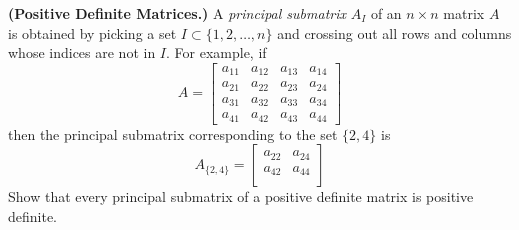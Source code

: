 \textbf{(Positive Definite Matrices.)}  A \textit{principal submatrix}
$A_I$ of  an $n \times n$ matrix $A$ is obtained by picking a set $I
\subset \{1,2,\dots,n\}$ and crossing out all rows and columns whose
indices are not in $I$. For example, if \[
A = \left[
  \begin{matrix}
    a_{11} & a_{12} & a_{13} & a_{14} \\
    a_{21} & a_{22} & a_{23} & a_{24}\\
    a_{31} & a_{32} & a_{33} & a_{34}\\
    a_{41} & a_{42} & a_{43} & a_{44}
\end{matrix}
\right]
\]
then the principal submatrix corresponding to the set $\{2,4\}$ is \[
A_{\{2,4\}} = \left[
  \begin{matrix}
  a_{22} & a_{24} \\
  a_{42} & a_{44} \\
  \end{matrix}
\right]
\]
Show that every principal submatrix of a positive definite matrix is
positive definite.

{\color{blue}


}
